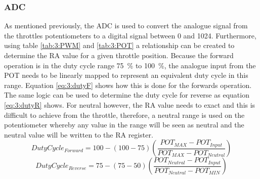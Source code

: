 	\subsubsection{ADC}
	As mentioned previously, the ADC is used to convert the analogue signal from the throttles potentiometers to a digital signal between 0 and 1024. Furthermore, using table \ref{tab:3:PWM} and \ref{tab:3:POT} a relationship can be created to determine the RA value for a given throttle position. Because the forward operation is in the duty cycle range \SI{75}{\percent} to \SI{100}{\percent}, the analogue input from the POT needs to be linearly mapped to represent an equivalent duty cycle in this range. Equation \ref{eq:3:dutyF} shows how this is done for the forwards operation. The same logic can be used to determine the duty cycle for reverse as equation \ref{eq:3:dutyR} shows. For neutral however, the RA value needs to exact and this is difficult to achieve from the throttle, therefore, a neutral range is used on the potentiometer whereby any value in the range will be seen as neutral and the neutral value will be written to the RA register.
	\begin{equation}
		Duty Cycle_{Forward} = 100 - (100-75)(\frac{POT_{MAX} - POT_{Input}}{POT_{MAX} - POT_{Neutral}})
		\label{eq:3:dutyF}
	\end{equation}
	\begin{equation}
		Duty Cycle_{Reverse} = 75 - (75-50)(\frac{POT_{Neutral} - POT_{Input}}{POT_{Neutral} - POT_{MIN}})
		\label{eq:3:dutyR}
	\end{equation}
